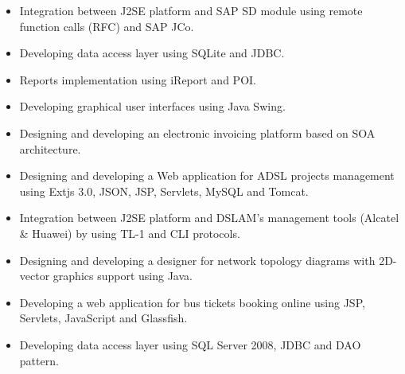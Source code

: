 \documentclass[10pt,a4paper,ragged2e]{altacv}
\begin{document}
\vspace{10px}

\begin{itemize}
   \item Integration between J2SE platform and SAP SD module using remote function calls (RFC) and SAP JCo.
   \item Developing data access layer using SQLite and JDBC.
   \item Reports implementation using iReport and POI.
   \item Developing graphical user interfaces using Java Swing.
   \item Designing and developing an electronic invoicing platform based on SOA architecture.
\end{itemize}

\vspace{10px}

\begin{itemize}
   \item Designing and developing a Web application for ADSL projects management using Extjs 3.0, JSON, JSP, Servlets, MySQL and Tomcat.
   \item Integration between J2SE platform and DSLAM's management tools (Alcatel \& Huawei) by using TL-1 and CLI protocols.
   \item Designing and developing a designer for network topology diagrams with 2D-vector graphics support using Java.
\end{itemize}

\vspace{10px}

\begin{itemize}
   \item Developing a web application for bus tickets booking online using JSP, Servlets, JavaScript and Glassfish.
   \item Developing data access layer using SQL Server 2008, JDBC and DAO pattern.
\end{itemize}

\vspace{10px}
\end{document}
